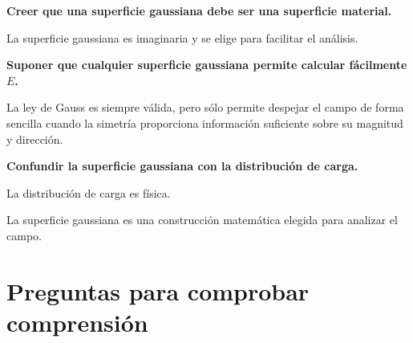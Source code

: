 \begin{errorfrecuente}

\textbf{Creer que una superficie gaussiana debe ser una superficie material.}

La superficie gaussiana es imaginaria y se elige para facilitar el análisis.

\end{errorfrecuente}


\begin{errorfrecuente}

\textbf{Suponer que cualquier superficie gaussiana permite calcular fácilmente \(E\).}

La ley de Gauss es siempre válida, pero sólo permite despejar el campo de forma sencilla
cuando la simetría proporciona información suficiente sobre su magnitud y dirección.

\end{errorfrecuente}


\begin{errorfrecuente}

\textbf{Confundir la superficie gaussiana con la distribución de carga.}

La distribución de carga es física.

La superficie gaussiana es una construcción matemática elegida para analizar el campo.

\end{errorfrecuente}


\section{Preguntas para comprobar comprensión}

